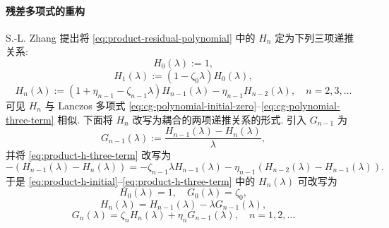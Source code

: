 \paragraph{{残差多项式的重构}}\label{subsec:product-polynomial-restructuring}\mbox{}\par
{S.-L. Zhang 提出将 \eqref{eq:product-residual-polynomial} 中的 $H_n$ 定为下列三项递推关系:}
\begin{equation}\label{eq:product-h-initial}H_0(\lambda):=1,\end{equation}
\begin{equation}\label{eq:product-h-first}H_1(\lambda):=(1-\zeta_0\lambda)H_0(\lambda),\end{equation}
\begin{equation}\label{eq:product-h-three-term}H_n(\lambda):=(1+\eta_{n-1}-\zeta_{n-1}\lambda)H_{n-1}(\lambda)-\eta_{n-1}H_{n-2}(\lambda),\quad n=2,3,\ldots\end{equation}
{可见 $H_n$ 与 Lanczos 多项式 \eqref{eq:cg-polynomial-initial-zero}--\eqref{eq:cg-polynomial-three-term} 相似.}
{下面将 $H_n$ 改写为耦合的两项递推关系的形式. 引入 $G_{n-1}$ 为}
\[G_{n-1}(\lambda):=\frac{H_{n-1}(\lambda)-H_n(\lambda)}{\lambda},\]
{并将 \eqref{eq:product-h-three-term} 改写为}
\[-(H_{n-1}(\lambda)-H_n(\lambda))=-\zeta_{n-1}\lambda H_{n-1}(\lambda)-\eta_{n-1}(H_{n-2}(\lambda)-H_{n-1}(\lambda)).\]
{于是 \eqref{eq:product-h-initial}--\eqref{eq:product-h-three-term} 中的 $H_n(\lambda)$ 可改写为}
\begin{equation}\label{eq:product-coupled-initial}H_0(\lambda)=1,\quad G_0(\lambda)=\zeta_0,\end{equation}
\begin{equation}\label{eq:product-coupled-h}H_n(\lambda)=H_{n-1}(\lambda)-\lambda G_{n-1}(\lambda),\end{equation}
\begin{equation}\label{eq:product-coupled-g}G_n(\lambda)=\zeta_nH_n(\lambda)+\eta_nG_{n-1}(\lambda),\quad n=1,2,\ldots\end{equation}
